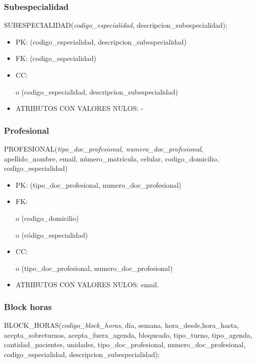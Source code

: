 \documentclass[a4paper,11pt]{article}
\begin{document}
\subsubsection{\textbf{Subespecialidad}}

SUBESPECIALIDAD(\emph{codigo\_especialidad}, descripcion\_subespecialidad);

\begin{itemize}
\item PK: (codigo\_especialidad, descripcion\_subespecialidad)

\item FK: (codigo\_especialidad)

\item CC:

o (codigo\_especialidad, descripcion\_subespecialidad)

\item ATRIBUTOS CON VALORES NULOS: -\label{HToc293405839}
\end{itemize}

\subsubsection{\textbf{Profesional}}

PROFESIONAL(\emph{tipo\_doc\_profesional, numero\_doc\_profesional}, apellido\_nombre, 
email, número\_matrícula, celular,\textit{\textbf{ }}codigo\_domicilio, codigo\_especialidad)

\begin{itemize}
\item PK: (tipo\_doc\_profesional, numero\_doc\_profesional)

\item FK: 

o (codigo\_domicilio)

o (código\_especialidad)

\item CC:

o (tipo\_doc\_profesional, numero\_doc\_profesional) 

\item ATRIBUTOS CON VALORES NULOS:  email.\label{HToc293405840}
\end{itemize}

\subsubsection{\textbf{Block horas}}

BLOCK\_HORAS(\emph{codigo\_block\_horas}, día, semana, hora\_desde,hora\_hasta, 
acepta\_sobreturnos, acepta\_fuera\_agenda, bloqueado, tipo\_turno, tipo\_agenda, 
cantidad\_pacientes, unidades,\emph{ }tipo\_doc\_profesional, numero\_doc\_profesional, 
codigo\_especialidad, descripcion\_subespecialidad);
\end{document}
